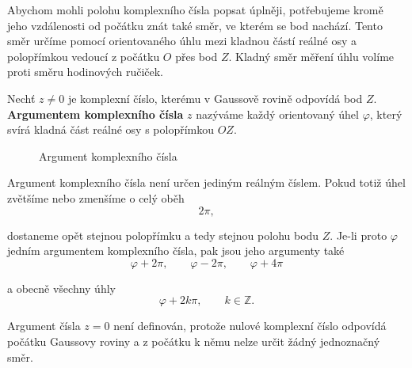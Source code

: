 \documentclass[12pt,a4paper]{article}
\begin{document}
Abychom mohli polohu komplexního čísla popsat úplněji, potřebujeme kromě jeho
vzdálenosti od počátku znát také směr, ve kterém se bod nachází. 
Tento směr určíme pomocí orientovaného úhlu mezi kladnou částí reálné osy a
polopřímkou vedoucí z počátku $O$ přes bod $Z$. 
Kladný směr měření úhlu volíme proti směru hodinových ručiček.

\begin{definitionbox}
    Nechť $z\neq0$ je komplexní číslo, kterému v Gaussově rovině odpovídá bod $Z$.
    \textbf{Argumentem komplexního čísla} $z$ nazýváme každý orientovaný úhel
    $\varphi$, který svírá kladná část reálné osy s polopřímkou $OZ$.
\end{definitionbox}

\begin{figure}[ht]
    \begin{center}
        \caption{Argument komplexního čísla}
    \end{center}
\end{figure}

Argument komplexního čísla není určen jediným reálným číslem. 
Pokud totiž úhel zvětšíme nebo zmenšíme o celý oběh
\[
    2\pi,
\]

dostaneme opět stejnou polopřímku a tedy stejnou polohu bodu $Z$. 
Je-li proto $\varphi$ jedním argumentem komplexního čísla, pak jsou jeho argumenty také
\[
    \varphi+2\pi, \qquad \varphi-2\pi, \qquad \varphi+4\pi
\]

a obecně všechny úhly
\[
    \varphi+2k\pi, \qquad k\in\mathbb{Z}.
\]

\begin{notebox}
    Argument čísla $z=0$ není definován, protože nulové komplexní číslo odpovídá
    počátku Gaussovy roviny a z počátku k němu nelze určit žádný jednoznačný směr.
\end{notebox}
\end{document}
